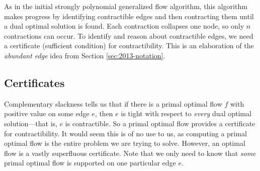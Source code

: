 \documentclass[11pt]{article}
\theoremstyle{definition}
\theoremstyle{definition}
\theoremstyle{definition}
\begin{document}
	
	
    
    As in the initial strongly polynomial generalized flow algorithm, this algorithm makes progress by
    identifying contractible edges and then contracting them until a dual optimal
    solution is found. Each contraction collapses one node, so only $n$ contractions
    can occur. To identify and reason about contractible edges, we need a certificate
    (sufficient condition) for contractibility. This is an elaboration of the \emph{abundant edge}
    idea from Section \ref{sec:2013-notation}.

	\subsection{Certificates}\label{sec:cert}
    
	Complementary slackness tells us that if there is a primal optimal flow $f$ with positive value
	on some edge $e$, then $e$ is tight with respect to \emph{every} dual optimal solution---that
	is, $e$ is contractible. So a primal optimal flow provides a certificate for contractibility.
	It would seem this is of no use to us, as computing a primal optimal flow is the entire
	problem we are trying to solve. However, an optimal flow is a vastly superfluous certificate.
	Note that we only need to know that \emph{some}
	primal optimal flow is supported on one particular edge $e$.
	
\end{document}
